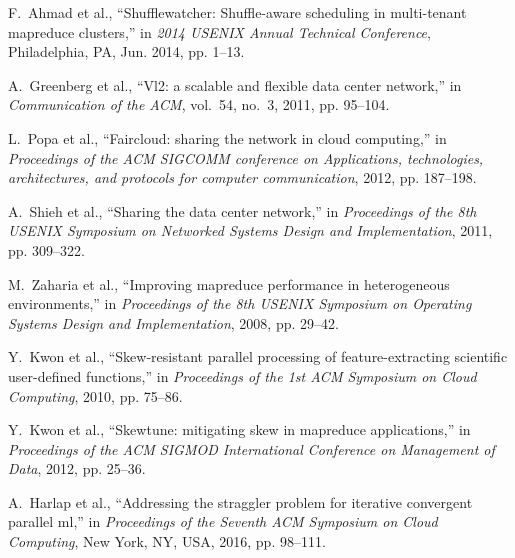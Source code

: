 \documentclass[10pt,journal,compsoc]{IEEEtran}
\begin{document}
\begin{thebibliography}{44}
F.~Ahmad et al.,
  ``Shufflewatcher: Shuffle-aware scheduling in multi-tenant mapreduce
  clusters,'' in \emph{2014 USENIX Annual Technical Conference}, Philadelphia, PA, Jun. 2014, pp. 1--13.

A.~Greenberg et al., ``Vl2: a scalable and flexible data center
  network,'' in \emph{Communication of the ACM}, vol.~54, no.~3, 2011, pp.
  95--104.

L.~Popa et al.,
  ``Faircloud: sharing the network in cloud computing,'' in \emph{Proceedings
  of the ACM SIGCOMM conference on Applications, technologies, architectures,
  and protocols for computer communication}, 2012, pp. 187--198.

A.~Shieh et al., ``Sharing the data
  center network,'' in \emph{Proceedings of the 8th USENIX Symposium on
  Networked Systems Design and Implementation}, 2011, pp. 309--322.

M.~Zaharia et al., ``Improving
  mapreduce performance in heterogeneous environments,'' in \emph{Proceedings
  of the 8th USENIX Symposium on Operating Systems Design and Implementation},
  2008, pp. 29--42.

Y.~Kwon et al., ``Skew-resistant parallel
  processing of feature-extracting scientific user-defined functions,'' in
  \emph{Proceedings of the 1st ACM Symposium on Cloud Computing}, 2010, pp. 75--86.

Y.~Kwon et al., ``Skewtune: mitigating skew in mapreduce applications,'' in
  \emph{Proceedings of the ACM SIGMOD International Conference on Management of
  Data}, 2012, pp. 25--36.

A.~Harlap et al., ``Addressing the straggler problem for iterative convergent
  parallel ml,'' in \emph{Proceedings of the Seventh ACM Symposium on Cloud
  Computing}, New York, NY, USA, 2016, pp. 98--111.


\end{thebibliography}

%
%
\end{document}
